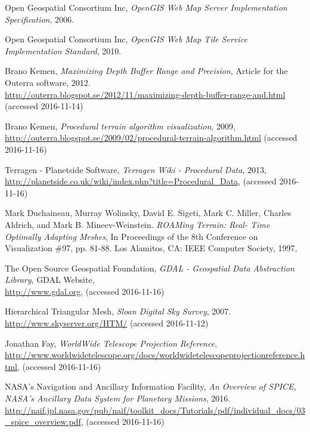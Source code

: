 \begin{thebibliography}{99}
  Open Geospatial Consortium Inc,
  \emph{OpenGIS Web Map Server Implementation Specification},
  2006.

  Open Geospatial Consortium Inc,
  \emph{OpenGIS Web Map Tile Service Implementation Standard},
  2010.

  Brano Kemen,
  \emph{Maximizing Depth Buffer Range and Precision},
  Article for the Outerra software,
  2012. \\
  \url{http://outerra.blogspot.se/2012/11/maximizing-depth-buffer-range-and.html}
  (accessed 2016-11-14)

  Brano Kemen,
  \emph{Procedural terrain algorithm visualization},
  2009, \\
  \url{http://outerra.blogspot.se/2009/02/procedural-terrain-algorithm.html}
  (accessed 2016-11-16)

  Terragen - Planetside Software,
  \emph{Terragen Wiki - Procedural Data},
  2013, \\
  \url{http://planetside.co.uk/wiki/index.php?title=Procedural_Data},
  (accessed 2016-11-16)

  Mark Duchaineau, Murray Wolinsky, David E. Sigeti, Mark C. Miller, Charles Aldrich, and Mark B. Mineev-Weinstein.
  \emph{ROAMing Terrain: Real- Time Optimally Adapting Meshes},
  In Proceedings of the 8th Conference on Visualization \#97, pp. 81-88. Los Alamitos, CA: IEEE Computer Society,
  1997, \\
  \url{}

  The Open Source Geospatial Foundation,
  \emph{GDAL - Geospatial Data Abstraction Library},
  GDAL Website,
  \\
  \url{http://www.gdal.org},
  (accessed 2016-11-16)

  Hierarchical Triangular Mesh,
  \emph{Sloan Digital Sky Survey},
  2007. \\
  \url{http://www.skyserver.org/HTM/}
  (accessed 2016-11-12)
  
  Jonathan Fay,
  \emph{WorldWide Telescope Projection Reference},
  \\
  \url{http://www.worldwidetelescope.org/docs/worldwidetelescopeprojectionreference.html},
  (accessed 2016-11-16)

  NASA's Navigation and Ancillary Information Facility,
  \emph{An Overview of SPICE, NASA's Ancillary Data System for Planetary Missions},
  2016. \\
  \url{http://naif.jpl.nasa.gov/pub/naif/toolkit_docs/Tutorials/pdf/individual_docs/03_spice_overview.pdf},
  (accessed 2016-11-16)


\end{thebibliography}
